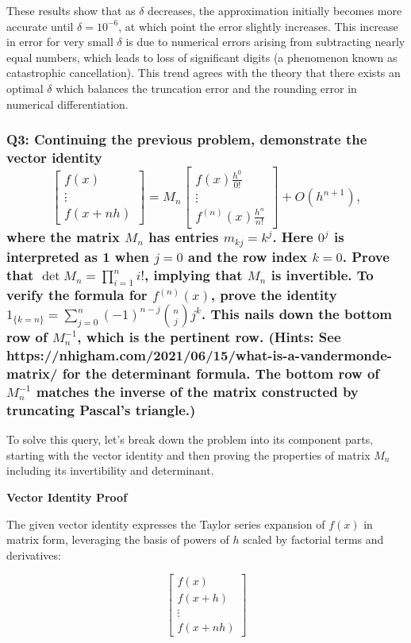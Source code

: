 \documentclass[8pt]{article}
\begin{document}
These results show that as \( \delta \) decreases, the approximation initially becomes more accurate until \( \delta = 10^{-6} \), at which point the error slightly increases. This increase in error for very small \( \delta \) is due to numerical errors arising from subtracting nearly equal numbers, which leads to loss of significant digits (a phenomenon known as catastrophic cancellation). This trend agrees with the theory that there exists an optimal \( \delta \) which balances the truncation error and the rounding error in numerical differentiation.

\subsubsection*{Q3: Continuing the previous problem, demonstrate the vector identity
\[
\begin{bmatrix}
f(x) \\
\vdots \\
f(x + nh)
\end{bmatrix}
=
M_n
\begin{bmatrix}
f(x) \frac{h^0}{0!} \\
\vdots \\
f^{(n)}(x) \frac{h^n}{n!}
\end{bmatrix}
+ O(h^{n+1}),
\]
where the matrix \( M_n \) has entries \( m_{kj} = k^j \). Here \( 0^j \) is interpreted as 1 when \( j = 0 \) and the row index \( k = 0 \). Prove that \( \det M_n = \prod_{i=1}^n i! \), implying that \( M_n \) is invertible. To verify the formula for \( f^{(n)}(x) \), prove the identity \( 1_{\{k=n\}} = \sum_{j=0}^n (-1)^{n-j} \binom{n}{j} j^k \). This nails down the bottom row of \( M_n^{-1} \), which is the pertinent row. (Hints: See https://nhigham.com/2021/06/15/what-is-a-vandermonde-matrix/ for the determinant formula. The bottom row of \( M_n^{-1} \) matches the inverse of the matrix constructed by truncating Pascal’s triangle.)}

To solve this query, let's break down the problem into its component parts, starting with the vector identity and then proving the properties of matrix \( M_n \) including its invertibility and determinant.

\textbf{Vector Identity Proof}

The given vector identity expresses the Taylor series expansion of \( f(x) \) in matrix form, leveraging the basis of powers of \( h \) scaled by factorial terms and derivatives:

\[
\begin{bmatrix}
f(x) \\
f(x + h) \\
\vdots \\
f(x + nh)
\end{bmatrix}
\]
\end{document}
